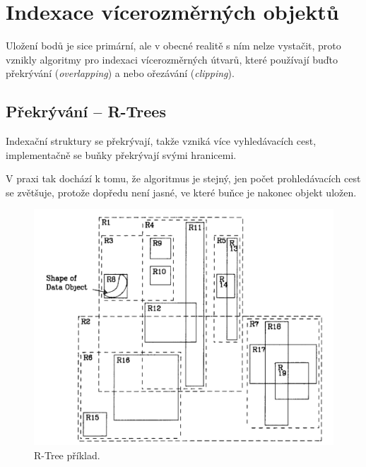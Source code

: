 
\section{Indexace vícerozměrných objektů}

\begin{compactitem}
    \item Uložení bodů je sice primární, ale v obecné realitě s ním nelze vystačit, proto vznikly algoritmy pro indexaci vícerozměrných útvarů, které používají buďto překrývání (\textit{overlapping}) a nebo ořezávání (\textit{clipping}).
\end{compactitem}

\subsection{Překrývání -- R-Trees}

\begin{compactitem}
    \item Indexační struktury se překrývají, takže vzniká více vyhledávacích cest, implementačně se buňky překrývají svými hranicemi.

    \item V praxi tak dochází k tomu, že algoritmus je stejný, jen počet prohledávacích cest se zvětšuje, protože dopředu není jasné, ve které buňce je nakonec objekt uložen.
\end{compactitem}

\begin{figure}[H]
    \centering
    \includegraphics[width=0.85\linewidth]{r_tree_1.pdf}
    \caption{R-Tree příklad.}
\end{figure}

